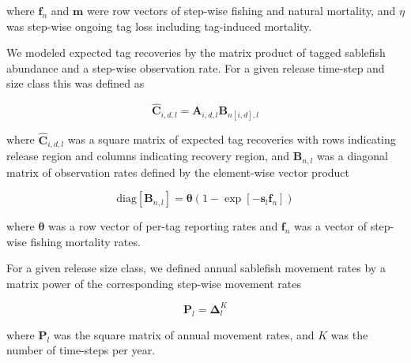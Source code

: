 \documentclass{article}
\begin{document}
\noindent where $\boldsymbol{f}_n$ and $\boldsymbol{m}$ were row vectors of step-wise fishing and natural mortality, and $\eta$ was step-wise ongoing tag loss including tag-induced mortality. 

We modeled expected tag recoveries by the matrix product of tagged sablefish abundance and a step-wise observation rate. For a given release time-step and size class this was defined as

\begin{equation}
  \label{eq:expected}
  \boldsymbol{\widehat{C}}_{i,d,l} = \boldsymbol{A}_{i,d,l} \boldsymbol{B}_{n[i,d],l}
\end{equation}

\noindent where $\boldsymbol{\widehat{C}}_{i,d,l}$ was a square matrix of expected tag recoveries with rows indicating release region and columns indicating recovery region, and $\boldsymbol{B}_{n,l}$ was a diagonal matrix of observation rates defined by the element-wise vector product

\begin{equation}
  \label{eq:observation}
  \mathrm{diag} \! \left[\boldsymbol{B}_{n,l}\right] = 
    \boldsymbol{\theta} \left(1 - \exp\!{\left[-\boldsymbol{s}_l \boldsymbol{f}_{n} \right]} \right) 
\end{equation}

\noindent where $\boldsymbol{\theta}$ was a row vector of per-tag reporting rates and $\boldsymbol{f}_n$ was a vector of step-wise fishing mortality rates.

For a given release size class, we defined annual sablefish movement rates by a matrix power of the corresponding step-wise movement rates

\begin{equation}
    \label{eq:movement}
    \boldsymbol{P}_{l} = \boldsymbol{\Delta}_{l}^K
\end{equation}

\noindent where $\boldsymbol{P}_{l}$ was the square matrix of annual movement rates, and $K$ was the number of time-steps per year.


\end{document}
